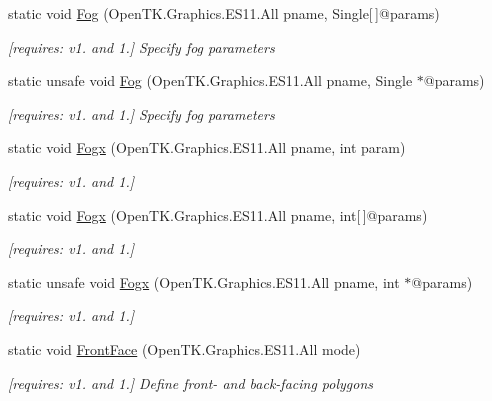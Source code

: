 \begin{DoxyCompactItemize}
static void \hyperlink{class_open_t_k_1_1_graphics_1_1_e_s11_1_1_g_l_ad2f42033b661026fc816944826851e29}{Fog} (Open\-T\-K.\-Graphics.\-E\-S11.\-All pname, Single\mbox{[}$\,$\mbox{]}@params)
\begin{DoxyCompactList}\small\item\em \mbox{[}requires\-: v1. and 1.\mbox{]} Specify fog parameters \end{DoxyCompactList}\item 
static unsafe void \hyperlink{class_open_t_k_1_1_graphics_1_1_e_s11_1_1_g_l_a6adfbe7dd572f2d8750bccc27fb0aed1}{Fog} (Open\-T\-K.\-Graphics.\-E\-S11.\-All pname, Single $\ast$@params)
\begin{DoxyCompactList}\small\item\em \mbox{[}requires\-: v1. and 1.\mbox{]} Specify fog parameters \end{DoxyCompactList}\item 
static void \hyperlink{class_open_t_k_1_1_graphics_1_1_e_s11_1_1_g_l_a8677b11f001ff22650cdd178eb51f4a2}{Fogx} (Open\-T\-K.\-Graphics.\-E\-S11.\-All pname, int param)
\begin{DoxyCompactList}\small\item\em \mbox{[}requires\-: v1. and 1.\mbox{]}\end{DoxyCompactList}\item 
static void \hyperlink{class_open_t_k_1_1_graphics_1_1_e_s11_1_1_g_l_a70f42c9cbb3d6cbefd82ebecbc641ff9}{Fogx} (Open\-T\-K.\-Graphics.\-E\-S11.\-All pname, int\mbox{[}$\,$\mbox{]}@params)
\begin{DoxyCompactList}\small\item\em \mbox{[}requires\-: v1. and 1.\mbox{]}\end{DoxyCompactList}\item 
static unsafe void \hyperlink{class_open_t_k_1_1_graphics_1_1_e_s11_1_1_g_l_a7268a8b1336b9ce8186efd14c3d539ae}{Fogx} (Open\-T\-K.\-Graphics.\-E\-S11.\-All pname, int $\ast$@params)
\begin{DoxyCompactList}\small\item\em \mbox{[}requires\-: v1. and 1.\mbox{]}\end{DoxyCompactList}\item 
static void \hyperlink{class_open_t_k_1_1_graphics_1_1_e_s11_1_1_g_l_a4e6b50846f7e0653d002a4bd67a20d75}{Front\-Face} (Open\-T\-K.\-Graphics.\-E\-S11.\-All mode)
\begin{DoxyCompactList}\small\item\em \mbox{[}requires\-: v1. and 1.\mbox{]} Define front-\/ and back-\/facing polygons \end{DoxyCompactList}\item 

\end{DoxyCompactItemize}
